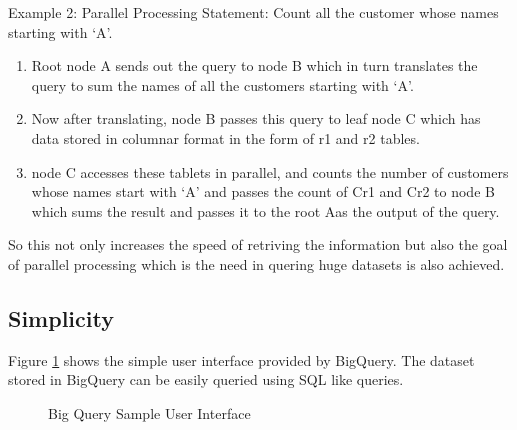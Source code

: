 \documentclass[9pt,twocolumn,twoside]{../../styles/osajnl}
\begin{document}
\noindent
Example 2: Parallel Processing \newline
Statement: Count all the customer whose names
starting with ‘A’. \newline

\begin{enumerate}[noitemsep,topsep=0pt]
\item Root node A sends out the query to node B which in turn
  translates the query to sum the names of all the customers starting
  with ‘A’. \item Now after translating, node B passes this query to
  leaf node C which has data stored in columnar format in the form of
  r1 and r2 tables. \item node C accesses these tablets in parallel,
  and counts the number of customers whose names start with ‘A’ and
  passes the count of Cr1 and Cr2 to node B which sums the result and
  passes it to the root Aas the output of the query. \end{enumerate}

\noindent
So this not only increases the speed of retriving the information but
also the goal of parallel processing which is the need in quering huge
datasets is also achieved.

\subsection{Simplicity}
Figure \ref{fig:bigqueryinterface} shows the simple user interface provided by BigQuery. The dataset stored in BigQuery can be easily queried using SQL like queries.

\begin{figure}[htbp]
\centering
{}
\caption{\cite{www-userinterface-bigquery} Big Query Sample User Interface}
\label{fig:bigqueryinterface}
\end{figure}
\end{document}

